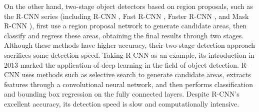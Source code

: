 \documentclass[journal]{IEEEtran}
\begin{document}
On the other hand, two-stage object detectors based on region proposals, such as the R-CNN series (including R-CNN \cite{tan2020efficientdet}, Fast R-CNN \cite{girshick2014rich}, Faster R-CNN \cite{ren2016faster}, and Mask R-CNN \cite{he2017mask}), first use a region proposal network to generate candidate areas, then classify and regress these areas, obtaining the final results through two stages. Although these methods have higher accuracy, their two-stage detection approach sacrifices some detection speed. Taking R-CNN as an example, its introduction in 2013 marked the application of deep learning in the field of object detection. R-CNN uses methods such as selective search to generate candidate areas, extracts features through a convolutional neural network, and then performs classification and bounding box regression on the fully connected layers. Despite R-CNN’s excellent accuracy, its detection speed is slow and computationally intensive.
\end{document}

